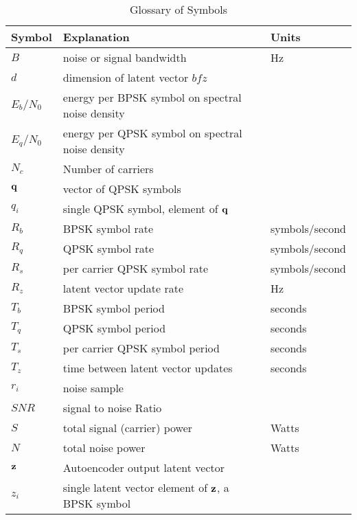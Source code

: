 \documentclass{article}
\begin{document}
\begin{table} [H]
\centering
\begin{tabular}{l l l}
 \hline
 Symbol & Explanation & Units \\
 \hline
 $B$ & noise or signal bandwidth & Hz \\
 $d$ & dimension of latent vector $bf{z}$ \\
 $E_b/N_0$ & energy per BPSK symbol on spectral noise density \\
 $E_q/N_0$ & energy per QPSK symbol on spectral noise density \\
 $N_c$ & Number of carriers  \\
 $\bf{q}$ & vector of QPSK symbols \\ 
 $q_i$ & single QPSK symbol, element of $\bf{q}$ \\ 
 $R_b$ & BPSK symbol rate & symbols/second \\
 $R_q$ & QPSK symbol rate & symbols/second \\
 $R_s$ & per carrier QPSK symbol rate & symbols/second \\
 $R_z$ & latent vector update rate & Hz \\
 $T_b$ & BPSK symbol period & seconds \\
 $T_q$ & QPSK symbol period & seconds \\
 $T_s$ & per carrier QPSK symbol period & seconds\\
 $T_z$ & time between latent vector updates & seconds\\
 $r_i$ & noise sample \\
 $SNR$ & signal to noise Ratio \\
 $S$ & total signal (carrier) power & Watts \\
 $N$ & total noise power & Watts \\
 $\bf{z}$ & Autoencoder output latent vector \\ 
 $z_i$ & single latent vector element of $\bf{z}$, a BPSK symbol \\ 
 \hline
\end{tabular}
\caption{Glossary of Symbols}
\end{table}
\end{document}
